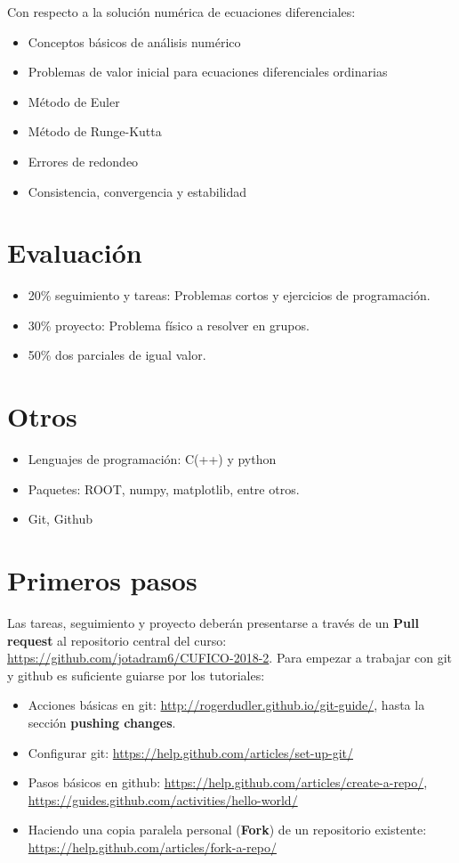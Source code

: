 \documentclass[10.5pt]{article}
\begin{document}
Con respecto a la solución numérica de ecuaciones diferenciales:
\begin{itemize}
\item Conceptos básicos de análisis numérico
\item Problemas de valor inicial para ecuaciones diferenciales ordinarias
\item Método de Euler
\item Método de Runge-Kutta
\item Errores de redondeo
\item Consistencia, convergencia y estabilidad
\end{itemize}

\section{Evaluación}

\begin{itemize}
\item 20\% seguimiento y tareas: Problemas cortos y ejercicios de programación.
\item 30\% proyecto: Problema físico a resolver en grupos.
\item 50\% dos parciales de igual valor. 
\end{itemize}

\section{Otros}

\begin{itemize}
\item Lenguajes de programación: C(++) y python
\item Paquetes: ROOT, numpy, matplotlib, entre otros.
\item Git, Github
\end{itemize}

\section{Primeros pasos}

Las tareas, seguimiento y proyecto deberán presentarse a través de un {\textbf{Pull request}} al repositorio central del curso: \url{https://github.com/jotadram6/CUFICO-2018-2}. Para empezar a trabajar con git y github es suficiente guiarse por los tutoriales:

\begin{itemize}
\item Acciones básicas en git: \url{http://rogerdudler.github.io/git-guide/}, hasta la sección {\textbf{pushing changes}}.
\item Configurar git: \url{https://help.github.com/articles/set-up-git/}
\item Pasos básicos en github: \url{https://help.github.com/articles/create-a-repo/}, \url{https://guides.github.com/activities/hello-world/}
\item Haciendo una copia paralela personal ({\textbf{Fork}}) de un repositorio existente: \url{https://help.github.com/articles/fork-a-repo/}
\end{itemize}
\end{document}
